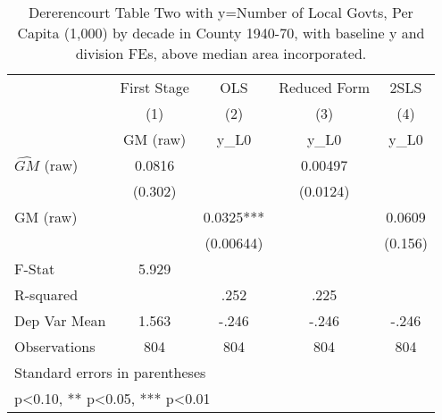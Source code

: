 \begin{table}[htbp]\centering
\def\sym#1{\ifmmode^{#1}\else\(^{#1}\)\fi}
\caption{Dererencourt Table Two with y=Number of Local Govts, Per Capita (1,000) by decade in County 1940-70, with baseline y and division FEs, above median area incorporated.}
\begin{tabular}{l*{4}{c}}
\toprule
                    & First Stage   &         OLS   &Reduced Form   &        2SLS   \\
                    &\multicolumn{1}{c}{(1)}&\multicolumn{1}{c}{(2)}&\multicolumn{1}{c}{(3)}&\multicolumn{1}{c}{(4)}\\
                    &\multicolumn{1}{c}{GM  (raw)}&\multicolumn{1}{c}{y\_L0}&\multicolumn{1}{c}{y\_L0}&\multicolumn{1}{c}{y\_L0}\\
\midrule
$\hat{GM}$ (raw)    &      0.0816   &               &     0.00497   &               \\
                    &     (0.302)   &               &    (0.0124)   &               \\
\addlinespace
GM  (raw)           &               &      0.0325***&               &      0.0609   \\
                    &               &   (0.00644)   &               &     (0.156)   \\
\midrule
F-Stat              &       5.929   &               &               &               \\
R-squared           &               &        .252   &        .225   &               \\
Dep Var Mean        &       1.563   &       -.246   &       -.246   &       -.246   \\
Observations        &         804   &         804   &         804   &         804   \\
\bottomrule
\multicolumn{5}{l}{\footnotesize Standard errors in parentheses}\\
\multicolumn{5}{l}{\footnotesize * p<0.10, ** p<0.05, *** p<0.01}\\
\end{tabular}
\end{table}
